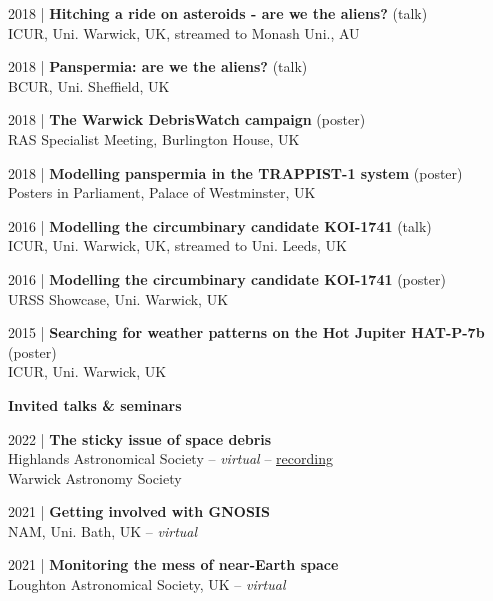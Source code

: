 \documentclass[10pt,a4paper]{altacv}
\begin{document}
\small 2018 | \textbf{Hitching a ride on asteroids - are we the aliens?} (talk) \\
ICUR, Uni. Warwick, UK, streamed to Monash Uni., AU

\smallskip

\small 2018 | \textbf{Panspermia: are we the aliens?} (talk) \\
BCUR, Uni. Sheffield, UK

\smallskip

\small 2018 | \textbf{The Warwick DebrisWatch campaign} (poster) \\
RAS Specialist Meeting, Burlington House, UK

\smallskip

\small 2018 | \textbf{Modelling panspermia in the TRAPPIST-1 system} (poster) \\
Posters in Parliament, Palace of Westminster, UK

\smallskip

\small 2016 | \textbf{Modelling the circumbinary candidate KOI-1741} (talk) \\
ICUR, Uni. Warwick, UK, streamed to Uni. Leeds, UK

\smallskip

\small 2016 | \textbf{Modelling the circumbinary candidate KOI-1741} (poster) \\
URSS Showcase, Uni. Warwick, UK

\smallskip

\small 2015 | \textbf{Searching for weather patterns on the Hot Jupiter HAT-P-7b} (poster) \\
ICUR, Uni. Warwick, UK

\divider

\normalsize \textbf{Invited talks \& seminars}

\medskip

\small 2022 | \textbf{The sticky issue of space debris} \\
Highlands Astronomical Society -- \textit{virtual} -- \href{https://youtu.be/WMC-LWQ0q7o}{recording} \\
Warwick Astronomy Society

\smallskip

\small 2021 | \textbf{Getting involved with GNOSIS} \\
NAM, Uni. Bath, UK -- \textit{virtual}

\smallskip

\small 2021 | \textbf{Monitoring the mess of near-Earth space} \\
Loughton Astronomical Society, UK -- \textit{virtual}
\end{document}
